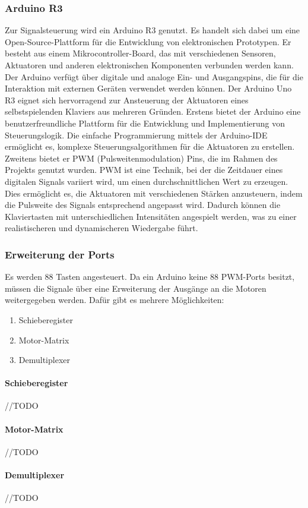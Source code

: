 \newline\subsubsection{Arduino R3}
Zur Signalsteuerung wird ein Arduino R3 genutzt.
Es handelt sich dabei um eine Open-Source-Plattform für die Entwicklung von elektronischen Prototypen. Er besteht aus
einem Mikrocontroller-Board, das mit verschiedenen Sensoren, Aktuatoren und anderen elektronischen Komponenten
verbunden werden kann. Der Arduino verfügt über digitale und analoge Ein- und Ausgangspins, die für die Interaktion mit
externen Geräten verwendet werden können. \newline
Der Arduino Uno R3 eignet sich hervorragend zur Ansteuerung der Aktuatoren eines selbstspielenden Klaviers aus
mehreren Gründen. Erstens bietet der Arduino eine benutzerfreundliche Plattform für die Entwicklung und Implementierung
von Steuerungslogik. Die einfache Programmierung mittels der Arduino-IDE ermöglicht es, komplexe Steuerungsalgorithmen
für die Aktuatoren zu erstellen. \newline
Zweitens bietet er PWM (Pulsweitenmodulation) Pins, die im Rahmen des Projekts genutzt wurden.
PWM ist eine Technik, bei der die Zeitdauer eines digitalen Signals variiert wird, um einen durchschnittlichen Wert zu
erzeugen. Dies ermöglicht es, die Aktuatoren mit verschiedenen Stärken anzusteuern, indem die Pulsweite des Signals
entsprechend angepasst wird. Dadurch können die Klaviertasten mit unterschiedlichen Intensitäten angespielt werden,
was zu einer realistischeren und dynamischeren Wiedergabe führt.

\newline \subsubsection{Erweiterung der Ports}
Es werden 88 Tasten angesteuert. Da ein Arduino keine 88 PWM-Ports besitzt, müssen die Signale über
eine Erweiterung der Ausgänge an die Motoren weitergegeben werden. Dafür gibt es mehrere Möglichkeiten:
\newline
\begin{enumerate}
	\item Schieberegister
	\item Motor-Matrix
	\item Demultiplexer
\end{enumerate}

\newline \paragraph{Schieberegister}
//TODO
\paragraph{Motor-Matrix}
//TODO
\paragraph{Demultiplexer}
//TODO


